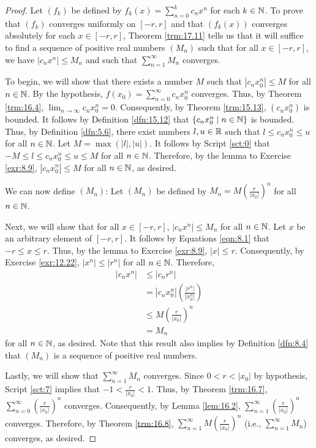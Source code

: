 \documentclass[../main.tex]{subfiles}
\begin{document}
\begin{theorem}
\begin{proof}
        Let $(f_k)$ be defined by $f_k(x)=\sum_{n=0}^kc_nx^n$ for each $k\in\mathbb{N}$. To prove that $(f_k)$ converges uniformly on $[-r,r]$ and that $(f_k(x))$ converges absolutely for each $x\in[-r,r]$, Theorem \ref{trm:17.11} tells us that it will suffice to find a sequence of positive real numbers $(M_n)$ such that for all $x\in[-r,r]$, we have $|c_nx^n|\leq M_n$ and such that $\sum_{n=1}^\infty M_n$ converges.\par\smallskip
        To begin, we will show that there exists a number $M$ such that $|c_nx_0^n|\leq M$ for all $n\in\mathbb{N}$. By the hypothesis, $f(x_0)=\sum_{n=0}^\infty c_nx_0^n$ converges. Thus, by Theorem \ref{trm:16.4}, $\lim_{n\to\infty}c_nx_0^n=0$. Consequently, by Theorem \ref{trm:15.13}, $(c_nx_0^n)$ is bounded. It follows by Definition \ref{dfn:15.12} that $\{c_nx_0^n\mid n\in\mathbb{N}\}$ is bounded. Thus, by Definition \ref{dfn:5.6}, there exist numbers $l,u\in\mathbb{R}$ such that $l\leq c_nx_0^n\leq u$ for all $n\in\mathbb{N}$. Let $M=\max(|l|,|u|)$. It follows by Script \ref{sct:0} that $-M\leq l\leq c_nx_0^n\leq u\leq M$ for all $n\in\mathbb{N}$. Therefore, by the lemma to Exercise \ref{exr:8.9}, $|c_nx_0^n|\leq M$ for all $n\in\mathbb{N}$, as desired.\par
        We can now define $(M_n)$: Let $(M_n)$ be defined by $M_n=M(\frac{r}{|x_0|})^n$ for all $n\in\mathbb{N}$.\par
        Next, we will show that for all $x\in[-r,r]$, $|c_nx^n|\leq M_n$ for all $n\in\mathbb{N}$. Let $x$ be an arbitrary element of $[-r,r]$. It follows by Equations \ref{eqn:8.1} that $-r\leq x\leq r$. Thus, by the lemma to Exercise \ref{exr:8.9}, $|x|\leq r$. Consequently, by Exercise \ref{exr:12.22}, $|x^n|\leq|r^n|$ for all $n\in\mathbb{N}$. Therefore,
        \begin{align*}
            |c_nx^n| &\leq |c_nr^n|\\
            &= |c_nx_0^n|\left( \frac{|r^n|}{|x_0^n|} \right)\\
            &\leq M\left( \frac{r}{|x_0|} \right)^n\\
            &= M_n
        \end{align*}
        for all $n\in\mathbb{N}$, as desired. Note that this result also implies by Definition \ref{dfn:8.4} that $(M_n)$ is a sequence of positive real numbers.\par
        Lastly, we will show that $\sum_{n=1}^\infty M_n$ converges. Since $0<r<|x_0|$ by hypothesis, Script \ref{sct:7} implies that $-1<\frac{r}{|x_0|}<1$. Thus, by Theorem \ref{trm:16.7}, $\sum_{n=0}^\infty(\frac{r}{|x_0|})^n$ converges. Consequently, by Lemma \ref{lem:16.2}, $\sum_{n=1}^\infty(\frac{r}{|x_0|})^n$ converges. Therefore, by Theorem \ref{trm:16.8}, $\sum_{n=1}^\infty M(\frac{r}{|x_0|})^n$ (i.e., $\sum_{n=1}^\infty M_n$) converges, as desired.\par\medskip

\end{proof}
\end{theorem}
\end{document}
